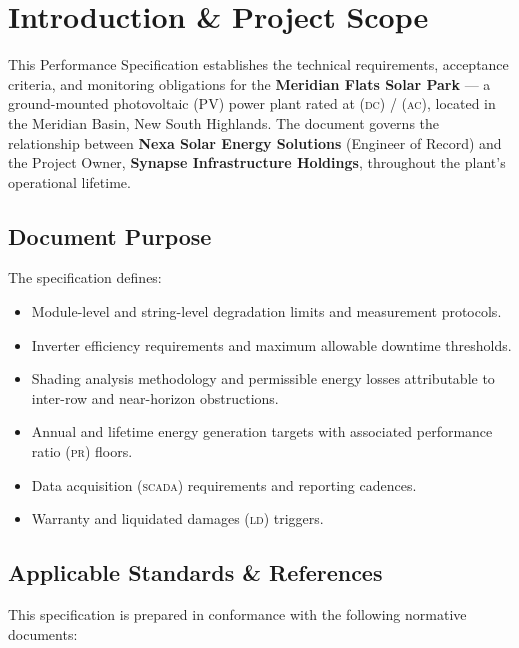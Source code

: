 
\section{Introduction \& Project Scope}

This Performance Specification establishes the technical requirements, acceptance criteria, and
monitoring obligations for the \textbf{Meridian Flats Solar Park} — a ground-mounted
photovoltaic (PV) power plant rated at  (\textsc{dc}) /
 (\textsc{ac}), located in the Meridian Basin, New South Highlands.
The document governs the relationship between \textbf{Nexa Solar Energy Solutions} (Engineer of
Record) and the Project Owner, \textbf{Synapse Infrastructure Holdings}, throughout the plant's
operational lifetime.

\subsection{Document Purpose}

The specification defines:

\begin{itemize}[leftmargin=1.4em, itemsep=3pt]
  \item Module-level and string-level degradation limits and measurement protocols.
  \item Inverter efficiency requirements and maximum allowable downtime thresholds.
  \item Shading analysis methodology and permissible energy losses attributable to
        inter-row and near-horizon obstructions.
  \item Annual and lifetime energy generation targets with associated performance ratio
        (\textsc{pr}) floors.
  \item Data acquisition (\textsc{scada}) requirements and reporting cadences.
  \item Warranty and liquidated damages (\textsc{ld}) triggers.
\end{itemize}

\subsection{Applicable Standards \& References}

This specification is prepared in conformance with the following normative documents:

